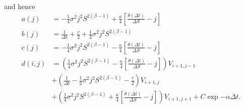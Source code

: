 and hence
\begin{equation}
	\begin{aligned}
		a(j) &= -\frac{1}{4}\sigma^2j^2S^{2(\beta -1) }+ \frac{\kappa}{4}\left[\frac{\theta(\Delta t)}{\Delta S} - j\right] \\
		b(j) &= \frac{1}{\Delta t} + \frac{r}{2} + \frac{1}{2}\sigma^2 j^2S^{2(\beta - 1)}\\
		c(j) &=  -\frac{1}{4}\sigma^2j^2S^{2(\beta -1) } - \frac{\kappa}{4}\left[\frac{\theta(\Delta t)}{\Delta S} - j\right]\\
		d(i,j)&=\left(\frac{1}{4}\sigma^2 j^2S^{2(\beta - 1)} - \frac{\kappa}{4}\left[\frac{\theta(\Delta t)}{\Delta S} - j\right]\right)V_{i+1,j-1}\\
		&+ \left(\frac{1}{\Delta t } - \frac{1}{2}\sigma^2 j^2S^{2(\beta - 1)}  - \frac{r}{2}\right)V_{i+1,j}\\
		&+ \left(\frac{1}{4}\sigma^2 j^2S^{2(\beta - 1)}+ \frac{\kappa}{4}\left[\frac{\theta(\Delta t)}{\Delta S} - j\right]\right)V_{i+1,j+1} + C \exp{-\alpha \Delta t}.
	\end{aligned}
\end{equation}